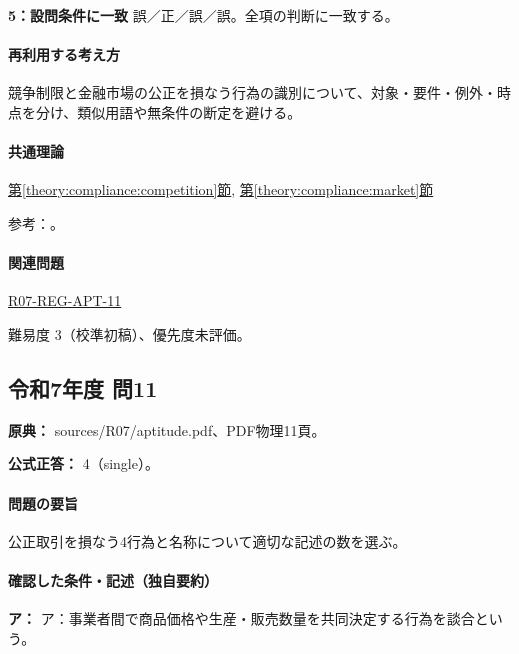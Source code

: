 \noindent\textbf{5：設問条件に一致} 誤／正／誤／誤。全項の判断に一致する。\par

\paragraph{再利用する考え方} 競争制限と金融市場の公正を損なう行為の識別について、対象・要件・例外・時点を分け、類似用語や無条件の断定を避ける。

\paragraph{共通理論} \hyperref[theory:compliance:competition]{第\ref*{theory:compliance:competition}節}, \hyperref[theory:compliance:market]{第\ref*{theory:compliance:market}節}

\par 参考：\cite{jftc_rules,jftc_bid_cartel2021,fsa_market2004,fsa_information}。

\paragraph{関連問題} \hyperref[q:r07-reg-apt-11]{R07-REG-APT-11}

\par 難易度 3（校準初稿）、優先度未評価。

\subsection{令和7年度 問11}
\label{q:r07-reg-apt-11}

\noindent\textbf{原典：} sources/R07/aptitude.pdf、PDF物理11頁。

\textbf{公式正答：} 4（single）。

\paragraph{問題の要旨} 公正取引を損なう4行為と名称について適切な記述の数を選ぶ。

\paragraph{確認した条件・記述（独自要約）}\mbox{}\par

\noindent\textbf{ア：} ア：事業者間で商品価格や生産・販売数量を共同決定する行為を談合という。\par

